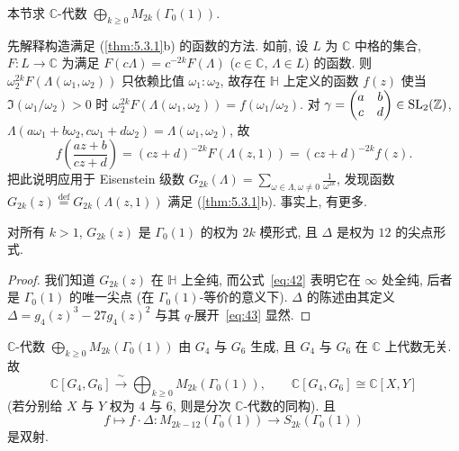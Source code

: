 本节求 $\mathbb{C}$-代数 $\bigoplus_{k\ge 0}M_{2k}(\Gamma_0(1))$.

先解释构造满足 (\ref{thm:5.3.1}b) 的函数的方法. 如前, 设 $L$ 为 $\mathbb{C}$ 中格的集合, $F\colon L\to\mathbb{C}$ 为满足 $F(c\Lambda) = c^{-2k}F(\Lambda)$ ($c\in\mathbb{C}$, $\Lambda\in L$) 的函数. 则 $\omega_2^{2k}F(\Lambda(\omega_1, \omega_2))$ 只依赖比值 $\omega_1:\omega_2$, 故存在 $\mathbb{H}$ 上定义的函数 $f(z)$ 使当 $\Im(\omega_1/\omega_2) > 0$ 时 $\omega_2^{2k}F(\Lambda(\omega_1, \omega_2)) = f(\omega_1/\omega_2)$. 对 $\gamma = \begin{pmatrix}a & b\\ c & d\end{pmatrix}\in\operatorname{SL}_2(\mathbb{Z})$, $\Lambda(a\omega_1 + b\omega_2, c\omega_1 + d\omega_2) = \Lambda(\omega_1, \omega_2)$, 故
\[
f\left(\frac{az+b}{cz+d}\right) = (cz+d)^{-2k}F(\Lambda(z,1)) = (cz+d)^{-2k}f(z).
\]
把此说明应用于 Eisenstein 级数 $G_{2k}(\Lambda) = \sum_{\omega\in\Lambda, \omega\neq 0}\frac{1}{\omega^{2k}}$, 发现函数 $G_{2k}(z) \overset{\text{def}}{=} G_{2k}(\Lambda(z, 1))$ 满足 (\ref{thm:5.3.1}b). 事实上, 有更多.

\begin{proposition} \label{thm:5.3.5} 
对所有 $k > 1$, $G_{2k}(z)$ 是 $\Gamma_0(1)$ 的权为 $2k$ 模形式, 且 $\Delta$ 是权为 $12$ 的尖点形式.
\end{proposition}

\begin{proof}
我们知道 $G_{2k}(z)$ 在 $\mathbb{H}$ 上全纯, 而公式~\eqref{eq:42} 表明它在 $\infty$ 处全纯, 后者是 $\Gamma_0(1)$ 的唯一尖点 (在 $\Gamma_0(1)$-等价的意义下). $\Delta$ 的陈述由其定义 $\Delta = g_4(z)^3 - 27g_4(z)^2$ 与其 $q$-展开~\eqref{eq:43} 显然.
\end{proof}

\begin{theorem} \label{thm:5.3.6} 
$\mathbb{C}$-代数 $\bigoplus_{k\ge 0}M_{2k}(\Gamma_0(1))$ 由 $G_4$ 与 $G_6$ 生成, 且 $G_4$ 与 $G_6$ 在 $\mathbb{C}$ 上代数无关. 故
\[
\mathbb{C}[G_4, G_6]\xrightarrow{\ \sim\ }\bigoplus_{k\ge 0}M_{2k}(\Gamma_0(1)), \qquad
\mathbb{C}[G_4, G_6]\cong\mathbb{C}[X, Y]
\]
(若分别给 $X$ 与 $Y$ 权为 $4$ 与 $6$, 则是分次 $\mathbb{C}$-代数的同构). 且
\[
f\mapsto f\cdot\Delta\colon M_{2k-12}(\Gamma_0(1))\to S_{2k}(\Gamma_0(1))
\]
是双射.
\end{theorem}


